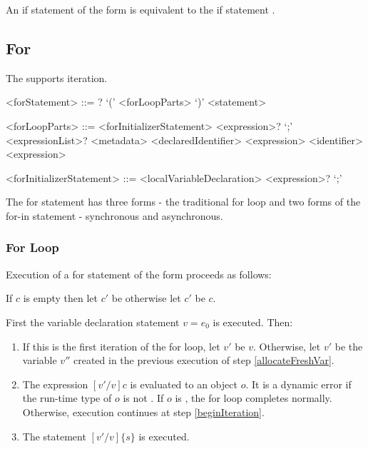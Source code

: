 \documentclass[makeidx]{article}
\begin{document}
{\LMHash{}%
An if statement of the form  is equivalent to
the if statement .


\subsection{For}

\LMHash{}%
The  supports iteration.

\begin{grammar}
<forStatement> ::= \AWAIT? \FOR{} `(' <forLoopParts> `)' <statement>

<forLoopParts> ::= <forInitializerStatement> <expression>? `;' <expressionList>?
  \alt <metadata> <declaredIdentifier> \IN{} <expression>
  \alt <identifier> \IN{} <expression>

<forInitializerStatement> ::= <localVariableDeclaration>
  \alt <expression>? `;'
\end{grammar}

\LMHash{}%
The for statement has three forms - the traditional for loop
and two forms of the for-in statement - synchronous and asynchronous.


\subsubsection{For Loop}

\LMHash{}%
Execution of a for statement of the form
 proceeds as follows:

\LMHash{}%
If $c$ is empty then let $c'$ be \TRUE{} otherwise let $c'$ be $c$.

\LMHash{}%
First the variable declaration statement \VAR{} $v = e_0$ is executed.
Then:
\begin{enumerate}
\item
  \label{beginFor}
  If this is the first iteration of the for loop, let $v'$ be $v$.
  Otherwise, let $v'$ be the variable $v''$ created in
  the previous execution of step \ref{allocateFreshVar}.
\item
  The expression $[v'/v]c$ is evaluated to an object $o$.
  It is a dynamic error if the run-time type of $o$ is not .
  If $o$ is \FALSE, the for loop completes normally.
  Otherwise, execution continues at step \ref{beginIteration}.
\item
  \label{beginIteration}
  The statement $[v'/v]\{s\}$ is executed.


\end{enumerate}}
\end{document}
